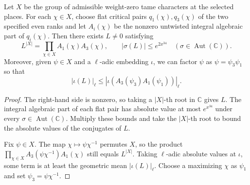 \begin{lemma}
\label{lem:c-test-geometric-mean}
\emitthmsource
Let $X$ be the group of admissible weight-zero tame characters at the selected places. For each $\chi\in X$, choose flat critical pairs $q_1(\chi),q_3(\chi)$ of the two specified even ranks and let $A_i(\chi)$ be the nonzero untwisted integral algebraic part of $q_i(\chi)$. Then there exists $L\ne0$ satisfying
\[
 L^{|X|}=\prod_{\chi\in X} A_1(\chi)A_3(\chi),
 \qquad |\sigma(L)|\le e^{2x^{34}}\quad(\sigma\in\operatorname{Aut}(\mathbb C)).
\]
Moreover, given $\psi\in X$ and a $\ell$-adic embedding $\iota$, we can factor $\psi$ as $\psi=\psi_3\psi_1$ so that
\[
 |\iota(L)|_\ell\le|\iota(A_3(\psi_3)A_1(\psi_1))|_\ell.
\]
\end{lemma}
\begin{proof}
The right-hand side is nonzero, so taking a $|X|$-th root in $\mathbb C$ gives $L$. The integral algebraic part of each flat pair has absolute value at most $e^{x^{34}}$ under every $\sigma\in\operatorname{Aut}(\mathbb C)$. Multiply these bounds and take the $|X|$-th root to bound the absolute values of the conjugates of $L$.

Fix $\psi\in X$. The map $\chi\mapsto\psi\chi^{-1}$ permutes $X$, so the product $\prod_{\chi\in X}A_3(\psi\chi^{-1})A_1(\chi)$ still equals $L^{|X|}$. Taking $\ell$-adic absolute values at $\iota$, some term is at least the geometric mean $|\iota(L)|_\ell$. Choose a maximizing $\chi$ as $\psi_1$ and set $\psi_3=\psi\chi^{-1}$.
\end{proof}

